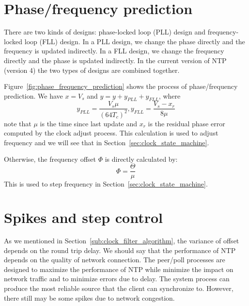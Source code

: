 


\section{Phase/frequency prediction}%
\label{sec:phase_frequency_prediction}
There are two kinds of designs: phase-locked loop (PLL) design and
frequency-locked loop (FLL) design. In a PLL design, we change the phase
directly and the frequency is updated indirectly. In a FLL design, we change
the frequency directly and the phase is updated indirectly. In the current version
of NTP (version 4) the two types of designs are combined together. 

Figure~\ref{fig:phase_frequency_prediction} shows the process of phase/frequency
prediction. We have $x = V_s$ and $y = y + y_{PLL} + y_{FLL}$, where
\begin{equation}
    y_{PLL} = \frac{V_s\mu}{\left(64T_c\right)^2},
    y_{FLL} = \frac{V_s-x_r}{8\mu}
    \label{eq:y_pll}
\end{equation}
note that $\mu$ is the time since last update and $x_r$ is the residual phase
error computed by the clock adjust process. This calculation is used to adjust
frequency and we will see that in Section~\ref{sec:clock_state_machine}.

Otherwise, the frequency offset $\Phi$ is directly calculated by:
\begin{equation}
    \Phi = \frac{\Theta}{\mu}
    \label{eq:frequency_offset}
\end{equation}
This is used to step frequency in Section~\ref{sec:clock_state_machine}.



\section{Spikes and step control}%
\label{sec:spikes_and_step_control}
As we mentioned in Section~\ref{sub:clock_filter_algorithm}, the variance of
offset depends on the round trip delay. We should say that the performance of
NTP depends on the quality of network connection. The peer/poll processes are
designed to maximize the performance of NTP while minimize the impact on
network traffic and to minimize errors due to delay. The system process can
produce the most reliable source that the client can synchronize to. However, 
there still may be some spikes due to network congestion. 

